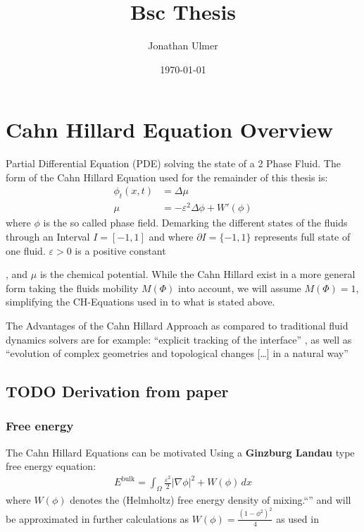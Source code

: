 \documentclass[11pt]{article}
\author{Jonathan Ulmer}
\date{\today}
\title{Bsc Thesis}
\begin{document}
\maketitle
\tableofcontents

\section{Cahn Hillard Equation Overview}
\label{sec:org5930194}
Partial Differential Equation (PDE) solving the state of a 2 Phase Fluid\autocite{Wu_2022}. The form of the Cahn Hillard Equation used for the remainder of this thesis is:
\begin{align}
\phi _t(x,t) &=  \Delta  \mu \\
\mu &= - \varepsilon^2 \Delta \phi   + W'(\phi)
\end{align}
where \(\phi\) is the so called phase field. Demarking the different states of the fluids through an Interval \(I=[-1,1]\) and where \(\partial I = \{-1,1\}\)  represents full state of one fluid. \(\varepsilon > 0\) is  a positive constant

, and \(\mu\) is the chemical potential\autocite{Wu_2022}. While the Cahn Hillard exist in a more general form taking the fluids mobility \(M(\Phi)\) into account, we will assume \(M(\Phi) = 1\), simplifying the CH-Equations used in\autocite{Wu_2022}\autocite{SHIN20117441} to what is stated above.


The Advantages of the Cahn Hillard Approach as compared to traditional fluid dynamics solvers are for example: ``explicit tracking of the interface'' \autocite{Wu_2022}, as well as ``evolution of complex geometries and topological changes [\ldots{}] in a natural way'' \autocite{Wu_2022}
\subsection{{\bfseries\sffamily TODO} Derivation from paper}
\label{sec:org20b4038}
\subsubsection{Free energy}
\label{sec:org8da09f7}
The Cahn Hillard Equations can be motivated Using a \textbf{Ginzburg Landau} type free energy equation:
\begin{align*}
E^{\text{bulk}}  = \int_{  \Omega}  \frac{\varepsilon^2}{2} |\nabla \phi |^2 + W(\phi) \,dx
\end{align*}
where \(W(\phi)\)  denotes the (Helmholtz) free energy density of mixing.``'' \autocite{Wu_2022} and will be approximated in further calculations as \(W(\phi) = \frac{(1-\phi ^2)^2}{4}\) as used in\autocite{SHIN20117441}
\end{document}
